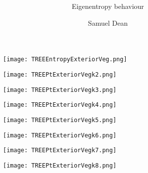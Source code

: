 \documentclass[pdf]{beamer}
\title{\textbf{}}
\subtitle{Eigenentropy behaviour}
\author{Samuel Dean}
\begin{document}
\begin{frame}
\titlepage
\end{frame}

\begin{frame}
\begin{figure}[!h]
\centering
\texttt{[image: TREEEntropyExteriorVeg.png]}
\end{figure}
\end{frame}

\begin{frame}
\begin{figure}[!h]
\centering
\texttt{[image: TREEPtExteriorVegk2.png]}
\end{figure}
\end{frame}

\begin{frame}
\begin{figure}[!h]
\centering
\texttt{[image: TREEPtExteriorVegk3.png]}
\end{figure}
\end{frame}

\begin{frame}
\begin{figure}[!h]
\centering
\texttt{[image: TREEPtExteriorVegk4.png]}
\end{figure}
\end{frame}

\begin{frame}
\begin{figure}[!h]
\centering
\texttt{[image: TREEPtExteriorVegk5.png]}
\end{figure}
\end{frame}

\begin{frame}
\begin{figure}[!h]
\centering
\texttt{[image: TREEPtExteriorVegk6.png]}
\end{figure}
\end{frame}

\begin{frame}
\begin{figure}[!h]
\centering
\texttt{[image: TREEPtExteriorVegk7.png]}
\end{figure}
\end{frame}

\begin{frame}
\begin{figure}[!h]
\centering
\texttt{[image: TREEPtExteriorVegk8.png]}
\end{figure}
\end{frame}
\end{document}
